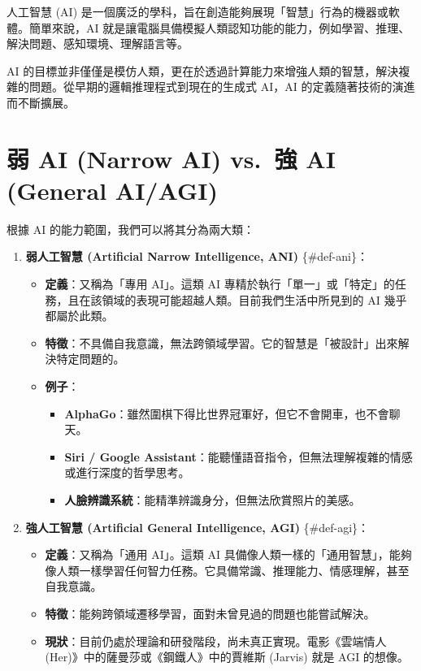 \documentclass[
  letterpaper,
  DIV=11,
  numbers=noendperiod]{scrreprt}
\providecommand{\tightlist}{%
  \setlength{\itemsep}{0pt}\setlength{\parskip}{0pt}}
\begin{document}
人工智慧 (AI)
是一個廣泛的學科，旨在創造能夠展現「智慧」行為的機器或軟體。簡單來說，AI
就是讓電腦具備模擬人類認知功能的能力，例如學習、推理、解決問題、感知環境、理解語言等。

AI
的目標並非僅僅是模仿人類，更在於透過計算能力來增強人類的智慧，解決複雜的問題。從早期的邏輯推理程式到現在的生成式
AI，AI 的定義隨著技術的演進而不斷擴展。

\section{弱 AI (Narrow AI) vs.~強 AI (General
AI/AGI)}\label{ux5f31-ai-narrow-ai-vs.-ux5f37-ai-general-aiagi}

根據 AI 的能力範圍，我們可以將其分為兩大類：

\begin{enumerate}
\def\labelenumi{\arabic{enumi}.}
\tightlist
\item
  \textbf{弱人工智慧 (Artificial Narrow Intelligence, ANI)}
  \{\#def-ani\}：

  \begin{itemize}
  \tightlist
  \item
    \textbf{定義}：又稱為「專用 AI」。這類 AI
    專精於執行「單一」或「特定」的任務，且在該領域的表現可能超越人類。目前我們生活中所見到的
    AI 幾乎都屬於此類。
  \item
    \textbf{特徵}：不具備自我意識，無法跨領域學習。它的智慧是「被設計」出來解決特定問題的。
  \item
    \textbf{例子}：

    \begin{itemize}
    \tightlist
    \item
      \textbf{AlphaGo}：雖然圍棋下得比世界冠軍好，但它不會開車，也不會聊天。
    \item
      \textbf{Siri / Google
      Assistant}：能聽懂語音指令，但無法理解複雜的情感或進行深度的哲學思考。
    \item
      \textbf{人臉辨識系統}：能精準辨識身分，但無法欣賞照片的美感。
    \end{itemize}
  \end{itemize}
\item
  \textbf{強人工智慧 (Artificial General Intelligence, AGI)}
  \{\#def-agi\}：

  \begin{itemize}
  \tightlist
  \item
    \textbf{定義}：又稱為「通用 AI」。這類 AI
    具備像人類一樣的「通用智慧」，能夠像人類一樣學習任何智力任務。它具備常識、推理能力、情感理解，甚至自我意識。
  \item
    \textbf{特徵}：能夠跨領域遷移學習，面對未曾見過的問題也能嘗試解決。
  \item
    \textbf{現狀}：目前仍處於理論和研發階段，尚未真正實現。電影《雲端情人
    (Her)》中的薩曼莎或《鋼鐵人》中的賈維斯 (Jarvis) 就是 AGI 的想像。
  \end{itemize}
\end{enumerate}
\end{document}
